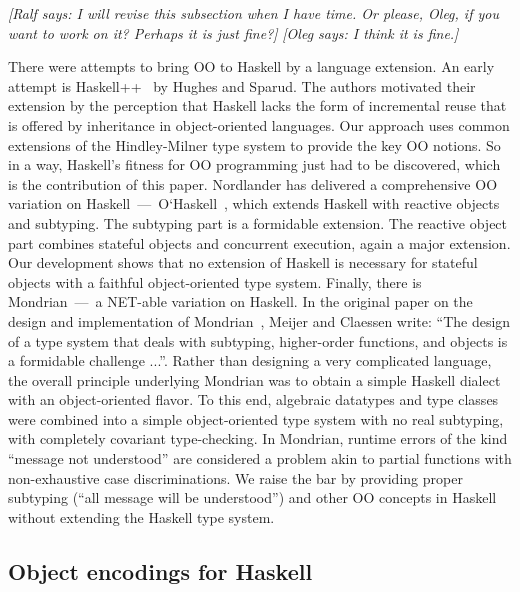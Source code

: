 \documentclass{jfp}
\newcommand{\oleg}[1]{{\it [Oleg says: #1]}}
\newcommand{\ralf}[1]{{\it [Ralf says: #1]}}
\begin{document}
\ralf{I will revise this subsection when I have time.
Or please, Oleg, if you want to work on it?
Perhaps it is just fine?}
\oleg{I think it is fine.}

There were attempts to bring OO to Haskell by a language extension. An
early attempt is Haskell++~\cite{HS95} by Hughes and Sparud. The
authors motivated their extension by the perception that Haskell lacks
the form of incremental reuse that is offered by inheritance in
object-oriented languages. Our approach uses common extensions of the
Hindley-Milner type system to provide the key OO notions.  So in a
way, Haskell's fitness for OO programming just had to be discovered,
which is the contribution of this paper. Nordlander has delivered a
comprehensive OO variation on
Haskell~---~O`Haskell~\cite{Nordlander98,Nordlander02}, which extends
Haskell with reactive objects and subtyping. The subtyping part is a
formidable extension. The reactive object part combines stateful
objects and concurrent execution, again a major extension. Our
development shows that no extension of Haskell is necessary for
stateful objects with a faithful object-oriented type system. Finally,
there is Mondrian~---~a NET-able variation on Haskell. In the original
paper on the design and implementation of Mondrian~\cite{MC97}, Meijer
and Claessen write: ``The design of a type system that deals with
subtyping, higher-order functions, and objects is a formidable
challenge ...''. Rather than designing a very complicated language,
the overall principle underlying Mondrian was to obtain a simple
Haskell dialect with an object-oriented flavor. To this end, algebraic
datatypes and type classes were combined into a simple object-oriented
type system with no real subtyping, with completely covariant
type-checking. In Mondrian, runtime errors of the kind ``message not
understood'' are considered a problem akin to partial functions with
non-exhaustive case discriminations. We raise the bar by providing
proper subtyping (``all message will be understood'') and other OO
concepts in Haskell without extending the Haskell type system.






\subsection{Object encodings for Haskell}
\end{document}
